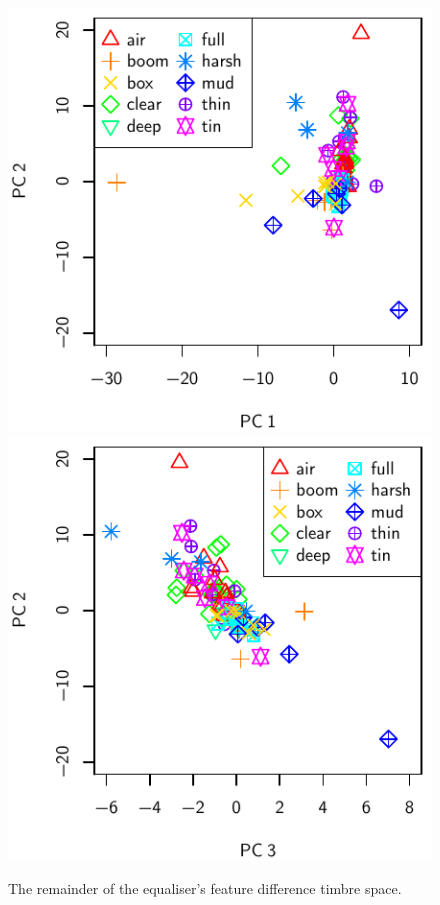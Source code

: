 			\begin{figure}[h!]
				\centering
				\subfloat
				{
					\includegraphics{chapter4/Images/EqualiserDifferencePCA1-2.pdf}
					\label{fig:EqualiserDifferencePCA1-2}
				}
				\quad
				\subfloat
				{
					\includegraphics{chapter4/Images/EqualiserDifferencePCA3-2.pdf}
					\label{fig:EqualiserDifferencePCA3-2}
				}
				\caption{The remainder of the equaliser's feature difference timbre space.}
				\label{fig:EqualiserDifferencePCAs}
			\end{figure}

